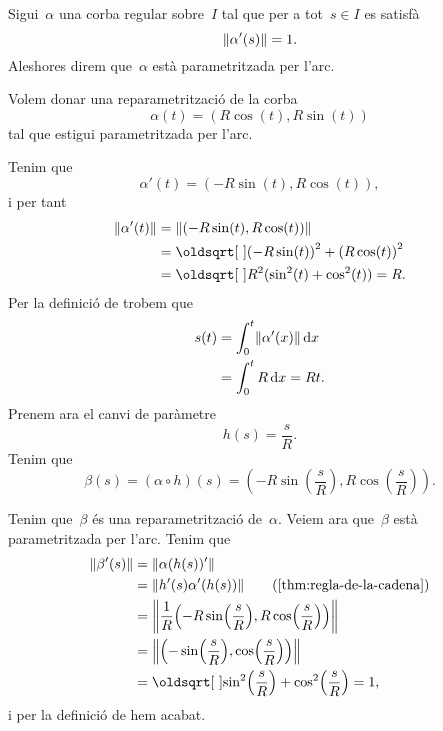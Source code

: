 \documentclass[../geometria-diferencial.tex]{subfiles}
\begin{document}
    \begin{definition}
        \label{def:corba-parametritzada-per-larc}
        Sigui~\(\alpha\) una corba regular sobre~\(I\) tal que per a tot~\(s\in I\) es satisfà
        \[
            \norm{\alpha'(s)}=1.
        \]
        Aleshores direm que~\(\alpha\) està parametritzada per l'arc.
    \end{definition}
    \begin{example} %
        \label{ex:reparametritzacio-per-larc-del-cercle-de-radi-R}
        \label{ex:circumferencia-de-radi-R-parametritzat-per-larc}
        Volem donar una reparametrització de la corba
        \[
            \alpha(t)=(R\cos(t),R\sin(t))
        \]
        tal que estigui parametritzada per l'arc.
    \end{example}
    \begin{solution}
        Tenim que
        \[
            \alpha'(t)=(-R\sin(t),R\cos(t)),
        \]
        i per tant
        \begin{align*}
            \norm{\alpha'(t)}&=\norm{(-R\sin(t),R\cos(t))} \\
            &=\sqrt{{(-R\sin(t))}^{2}+{(R\cos(t))}^{2}} \\
            &=\sqrt{R^{2}(\sin^{2}(t)+\cos^{2}(t))}=R.
        \end{align*}
        Per la definició de  trobem que
        \begin{align*}
            s(t)&=\int_{0}^{t}\norm{\alpha'(x)}\diff x \\
            &=\int_{0}^{t}R\diff x=Rt.
        \end{align*}
        Prenem ara el canvi de paràmetre
        \[
            h(s)=\frac{s}{R}.
        \]
        Tenim que
        \[
            \beta(s)=(\alpha\circ h)(s)=\left(-R\sin\left(\frac{s}{R}\right),R\cos\left(\frac{s}{R}\right)\right).
        \]

        Tenim que~\(\beta\) és una reparametrització de~\(\alpha\).
        Veiem ara que~\(\beta\) està parametritzada per l'arc.
        Tenim que
        \begin{align*}
            \norm{\beta'(s)}&=\norm{\alpha(h(s))'} \\
            &=\norm{h'(s)\alpha'(h(s))} \tag{\ref{thm:regla-de-la-cadena}}\\
            &=\norm{\frac{1}{R}\left(-R\sin\left(\frac{s}{R}\right),R\cos\left(\frac{s}{R}\right)\right)} \\
            &=\norm{\left(-\sin\left(\frac{s}{R}\right),\cos\left(\frac{s}{R}\right)\right)} \\
            &=\sqrt{\sin^{2}\left(\frac{s}{R}\right)+\cos^{2}\left(\frac{s}{R}\right)}=1,
        \end{align*}
        i per la definició de  hem acabat.
    \end{solution}
\end{document}
